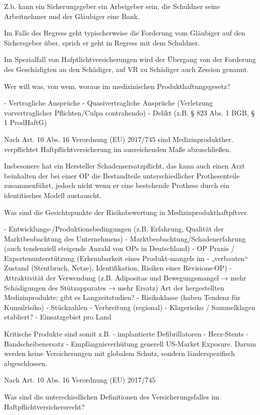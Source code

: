 Z.b. kann ein Sicherungsgeber ein Arbeigeber sein, die Schuldner seine Arbeitnehmer und der Gläubiger eine Bank.

Im Falle des Regress geht typischerweise die Forderung vom Gläubiger auf den Sichersgeber über, sprich 
er geht in Regress mit dem Schuldner.

Im Spezialfall von Hafptlichtversicherungen wird der Übergang von der Forderung des Geschädigten an den Schädiger,
auf VR zu Schädiger auch Zession genannt.


Wer will was, von wem, woraus im medizinischen Produkthaftungsgesetz?

- Vertragliche Ansprüche
- Quasivertragliche Ansprüche (Verletzung vorvertraglicher Pflichten/Culpa contrahendo)
- Delikt (z.B. § 823 Abs. 1 BGB, § 1 ProdHaftG)

Nach Art. 10 Abs. 16 Verordnung (EU) 2017/745 sind Medizinprodukther. verpflichtet
Haftpflichtversicherung im ausreichenden Maße abzuschließen.

Insbesonere hat ein Hersteller Schadensersatzpflicht, das kann auch einen Arzt beinhalten 
der bei einer OP die Bestandteile unterschiedlicher Prothesenteile zusammenführt, jedoch
nicht wenn er eine bestehende Prothese durch ein identitisches Modell austauscht.


Was sind die Gesichtspunkte der Risikobewertung in Medizinprodukthaftpftver.

- Entwicklungs-/Produktionsbedingungen (z.B. Erfahrung, Qualität der Marktbeobachtung des Unternehmens)
- Marktbeobachtung/Schadenerfahrung (auch tendenziell steigende Anzahl von OPs in Deutschland)
- OP Praxis / Expertenunterstützung (Erkennbarkeit eines Produkt-mangels im
- „verbauten“ Zustand (Stentbruch, Netze), Identifikation, Risiken einer Revisions-OP)
- Attraktivität der Verwendung (z.B. Adipositas und Bewegungsmangel → mehr Schädigungen des Stützapparates → mehr Ersatz)
Art der hergestellten Medizinprodukte; gibt es Langzeitstudien?
- Risikoklasse (haben Tendenz für Kumulrisiko)
- Stückzahlen
- Verbreitung (regional)
- Klagerisiko / Sammelklagen etabliert?
- Einsatzgebiet pro Land

Kritische Produkte sind somit z.B.
- implantierte Defibrillatoren
- Herz-Stents
- Bandscheibenersatz 
- Empfängnisverhütung
generell US-Market Exposure.
Darum werden keine Versicherungen mit globalem Schutz, sondern länderspezifisch abgeschlossen.

Nach Art. 10 Abs. 16 Verordnung (EU) 2017/745


Was sind die unterschiedlichen Definitionen des Versicherungsfalles im Haftpflichtversichersrecht?

